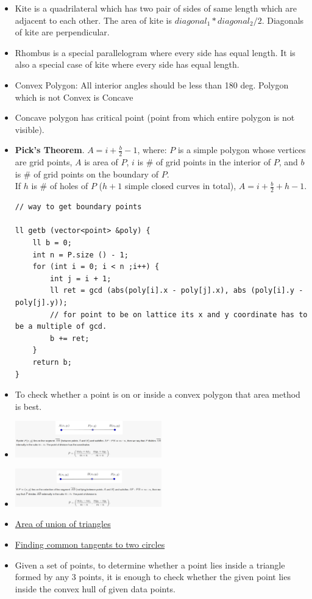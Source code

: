 \documentclass[8pt, a4paper, oneside, twocolumn]{extarticle}
\begin{document}
\begin{itemize}
\begin{itemize}
    \end{itemize}
    \item Kite is a quadrilateral which has two pair of sides of same length which are adjacent to each other. The area of kite is $diagonal_1*diagonal_2/2$. Diagonals of kite are perpendicular.
    \item Rhombus is a special parallelogram where every side has equal length. It is also a special case of kite where every side has equal length.    
    \item Convex Polygon: All interior angles should be less than 180 deg. Polygon which is not Convex is Concave
    \item Concave polygon has critical point (point from which entire polygon is not visible).
    \item \textbf{Pick's Theorem}. $A=i+\frac{b}{2}-1$, where: $P$ is a simple polygon whose vertices are grid points, $A$ is area of $P$, $i$ is \# of grid points in the interior of $P$, and $b$ is \# of grid points on the boundary of $P$. \\
    If $h$ is \# of holes of $P$ ($h+1$ simple closed curves in total), $A=i+\frac{b}{2}+h-1$.
    \begin{verbatim}
// way to get boundary points

ll getb (vector<point> &poly) {
    ll b = 0;
    int n = P.size () - 1;
    for (int i = 0; i < n ;i++) {
        int j = i + 1; 
        ll ret = gcd (abs(poly[i].x - poly[j].x), abs (poly[i].y - poly[j].y));
        // for point to be on lattice its x and y coordinate has to be a multiple of gcd.
        b += ret;
    }
    return b;
}
    \end{verbatim}
    \item To check whether a point is on or inside a convex polygon that area method is best.
    \item \includegraphics[width=0.5\textwidth,height=0.5\textheight,keepaspectratio]{p1} 
    \item \includegraphics[width=0.5\textwidth,height=0.5\textheight,keepaspectratio]{p2}
    \item \href{https://github.com/sourabh2311/Competitive-Programming/blob/master/Libs/areaOfUnionOfTriangles.cpp}{Area of union of triangles}
    \item \href{http://e-maxx.ru/algo/circle_tangents}{Finding common tangents to two circles}
    \item Given a set of points, to determine whether a point lies inside a triangle formed by any 3 points, it is enough to check whether the given point lies inside the convex hull of given data points.
\end{itemize}
\end{document}
